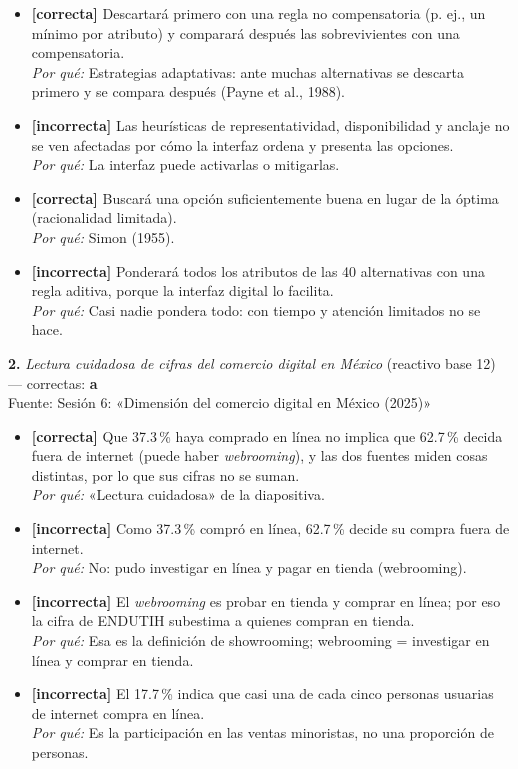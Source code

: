 \documentclass[10pt,letterpaper]{article}
\begin{document}
\begin{itemize}[leftmargin=1.2em,itemsep=0pt,topsep=1pt,parsep=0pt]
\item[\textbf{a)}] {\footnotesize \textbf{[correcta]} Descartará primero con una regla no compensatoria (p. ej., un mínimo por atributo) y comparará después las sobrevivientes con una compensatoria.\\ \textit{Por qué:} Estrategias adaptativas: ante muchas alternativas se descarta primero y se compara después (Payne et al., 1988).}
\item[\textbf{b)}] {\footnotesize \textbf{[incorrecta]} Las heurísticas de representatividad, disponibilidad y anclaje no se ven afectadas por cómo la interfaz ordena y presenta las opciones.\\ \textit{Por qué:} La interfaz puede activarlas o mitigarlas.}
\item[\textbf{c)}] {\footnotesize \textbf{[correcta]} Buscará una opción suficientemente buena en lugar de la óptima (racionalidad limitada).\\ \textit{Por qué:} Simon (1955).}
\item[\textbf{d)}] {\footnotesize \textbf{[incorrecta]} Ponderará todos los atributos de las 40 alternativas con una regla aditiva, porque la interfaz digital lo facilita.\\ \textit{Por qué:} Casi nadie pondera todo: con tiempo y atención limitados no se hace.}
\end{itemize}
\vspace{3pt}\noindent\textbf{2.} \textit{Lectura cuidadosa de cifras del comercio digital en México} (reactivo base 12) — correctas: \textbf{a}\\[-1pt]
{\scriptsize Fuente: Sesión 6: «Dimensión del comercio digital en México (2025)»}
\begin{itemize}[leftmargin=1.2em,itemsep=0pt,topsep=1pt,parsep=0pt]
\item[\textbf{a)}] {\footnotesize \textbf{[correcta]} Que 37.3\,\% haya comprado en línea no implica que 62.7\,\% decida fuera de internet (puede haber \textit{webrooming}), y las dos fuentes miden cosas distintas, por lo que sus cifras no se suman.\\ \textit{Por qué:} «Lectura cuidadosa» de la diapositiva.}
\item[\textbf{b)}] {\footnotesize \textbf{[incorrecta]} Como 37.3\,\% compró en línea, 62.7\,\% decide su compra fuera de internet.\\ \textit{Por qué:} No: pudo investigar en línea y pagar en tienda (webrooming).}
\item[\textbf{c)}] {\footnotesize \textbf{[incorrecta]} El \textit{webrooming} es probar en tienda y comprar en línea; por eso la cifra de ENDUTIH subestima a quienes compran en tienda.\\ \textit{Por qué:} Esa es la definición de showrooming; webrooming = investigar en línea y comprar en tienda.}
\item[\textbf{d)}] {\footnotesize \textbf{[incorrecta]} El 17.7\,\% indica que casi una de cada cinco personas usuarias de internet compra en línea.\\ \textit{Por qué:} Es la participación en las ventas minoristas, no una proporción de personas.}
\end{itemize}
\end{document}
